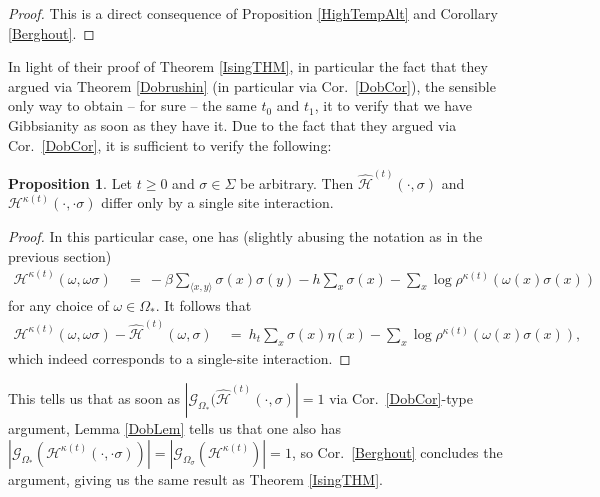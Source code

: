 \documentclass[12pt]{article}
\newcommand{\G}{\mathcal{G}}
\renewcommand{\H}{\mathcal{H}}
\newcommand{\pika}{\boldsymbol{\cdot}}
\newcommand{\1}{\mathbbm{1}}
\renewcommand{\sp}[1]{\langle #1\rangle}
\newcommand{\5}{\vspace{0.5cm}}
\renewcommand{\hat}{\widehat}
\theoremstyle{definition}
\newtheorem{prop}[thm]{Proposition}
\begin{document}
\begin{proof}
This is a direct consequence of Proposition \ref{HighTempAlt} and Corollary \ref{Berghout}.
\end{proof}

In light of their proof of Theorem \ref{IsingTHM}, in particular the fact that they argued via Theorem \ref{Dobrushin} (in particular via Cor.~\ref{DobCor}), the sensible only way to obtain -- for sure -- the same $t_0$ and $t_1$, it to verify that we have Gibbsianity as soon as they have it. Due to the fact that they argued via Cor.~\ref{DobCor}, it is sufficient to verify the following:
\begin{prop} Let $t\geq 0$ and $\sigma\in\Sigma$ be arbitrary. Then $\hat{\H}^{(t)}(\pika,\sigma)$ and $\H^{\kappa(t)}(\pika,\pika\sigma)$ differ only by a single site interaction.
\end{prop}
\begin{proof}
In this particular case, one has (slightly abusing the notation as in the previous section)
\begin{align*}
\H^{\kappa(t)}(\omega,\omega\sigma) ~&=~ -\beta\sum_{\sp{x,y}}\sigma(x)\sigma(y) - h\sum_{x}\sigma(x) -\sum_{x}\log\rho^{\kappa(t)}(\omega(x)\sigma(x))
\end{align*}
for any choice of $\omega\in\Omega_*$. It follows that
\begin{align*}
\H^{\kappa(t)}(\omega,\omega\sigma) - \hat{\H}^{(t)}(\omega,\sigma) ~&=~ h_t\sum_{x}\sigma(x)\eta(x) - \sum_{x}\log\rho^{\kappa(t)}(\omega(x)\sigma(x)),
\end{align*}
which indeed corresponds to a single-site interaction.
\end{proof}

This tells us that as soon as $|\G_{\Omega_*}(\hat{\H}^{(t)}(\pika,\sigma)|=1$ via Cor.~\ref{DobCor}-type argument, Lemma \ref{DobLem} tells us that one also has $|\G_{\Omega_*}(\H^{\kappa(t)}(\pika,\pika\sigma))|=|\G_{\Omega_\sigma}(\H^{\kappa(t)})|=1$, so Cor.~\ref{Berghout} concludes the argument, giving us the same result as Theorem \ref{IsingTHM}.

\pagebreak


\end{document}
